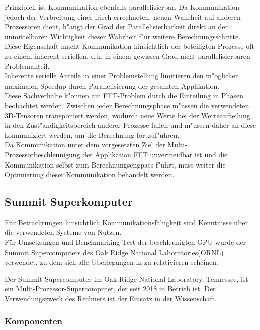 Prinzipiell ist Kommunikation ebenfalls parallelisierbar. Da Kommunikation jedoch der Verbreitung einer frisch errechneten, neuen Wahrheit auf anderen Prozessoren dient, h"angt der Grad der Parallelisierbarkeit direkt an der unmittelbaren Wichtigkeit dieser Wahrheit f"ur weitere Berechnungsschritte.\\
Diese Eigenschaft macht Kommunikation hinsichtlich der beteiligten Prozesse oft zu einem inherent seriellen, d.h. in einem gewissen Grad nicht parallelisierbaren Problemanteil.\\
Inherente serielle Anteile in einer Problemstellung limitieren den m"oglichen maximalen Speedup durch Parallelisierung der gesamten Applikation.\\
Diese Sachverhalte k"onnen am FFT-Problem durch die Einteilung in Phasen beobachtet werden. Zwischen jeder Berechnungsphase m"ussen die verwendeten 3D-Tensoren transponiert werden, wodurch neue Werte bei der Werteaufteilung in den Zust"andigkeitsbereich anderer Prozesse fallen und m"ussen daher an diese kommuniziert werden, um die Berechnung fortzuf"uhren.\\
Da Kommunikation unter dem vorgesetzten Ziel der Multi-Prozessorbeschleunigung der Applikation FFT unvermeidbar ist und die Kommunikation selbst zum Berechnungsengpass f"uhrt, muss weiter die Optimierung dieser Kommunikation behandelt werden.


\subsection{Summit Superkomputer}
Für Betrachtungen hinsichtlich Kommunikationsfähigkeit sind Kenntnisse über die verwendeten Systeme von Nutzen.\\
Für Umsetzungen und Benchmarking-Test der beschleunigten GPU wurde der Summit Supercomputers des Oak Ridge National Laboratories(ORNL) verwendet, zu dem sich alle Überlegungen in \cite{mainpaper} zu relativieren scheinen.

Der Summit-Supercomputer im Oak Ridge National Laboratory, Tennessee, ist ein Multi-Prozessor-Supercomputer, der seit 2018 in Betrieb ist. Der Verwendungszweck des Rechners ist der Einsatz in der Wissenschaft.

\subsubsection{Komponenten}

